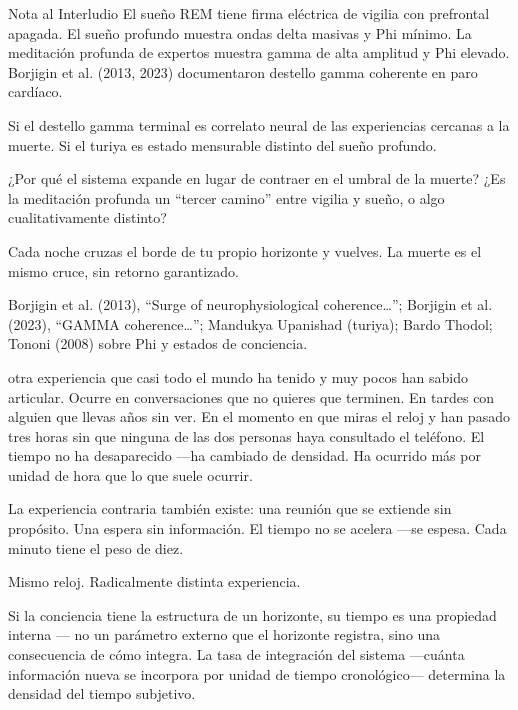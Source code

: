 \begin{notacap}{Nota al Interludio}
 El sueño REM tiene firma eléctrica de vigilia con prefrontal apagada. El sueño profundo muestra ondas delta masivas y Phi mínimo. La meditación profunda de expertos muestra gamma de alta amplitud y Phi elevado. Borjigin et al. (2013, 2023) documentaron destello gamma coherente en paro cardíaco.

 Si el destello gamma terminal es correlato neural de las experiencias cercanas a la muerte. Si el turiya es estado mensurable distinto del sueño profundo.

 ¿Por qué el sistema expande en lugar de contraer en el umbral de la muerte? ¿Es la meditación profunda un “tercer camino” entre vigilia y sueño, o algo cualitativamente distinto?

 Cada noche cruzas el borde de tu propio horizonte y vuelves. La muerte es el mismo cruce, sin retorno garantizado.

 Borjigin et al. (2013), “Surge of neurophysiological coherence…”; Borjigin et al. (2023), “GAMMA coherence…”; Mandukya Upanishad (turiya); Bardo Thodol; Tononi (2008) sobre Phi y estados de conciencia.
\end{notacap}
\noindent {} otra experiencia que casi todo el mundo ha tenido y muy pocos han sabido articular. Ocurre en conversaciones que no quieres que terminen. En tardes con alguien que llevas años sin ver. En el momento en que miras el reloj y han pasado tres horas sin que ninguna de las dos personas haya consultado el teléfono. El tiempo no ha desaparecido —ha cambiado de densidad. Ha ocurrido más por unidad de hora que lo que suele ocurrir.

La experiencia contraria también existe: una reunión que se extiende sin propósito. Una espera sin información. El tiempo no se acelera —se espesa. Cada minuto tiene el peso de diez.

Mismo reloj. Radicalmente distinta experiencia.

\noindent Si la conciencia tiene la estructura de un horizonte, su tiempo es una propiedad interna — no un parámetro externo que el horizonte registra, sino una consecuencia de cómo integra. La tasa de integración del sistema —cuánta información nueva se incorpora por unidad de tiempo cronológico— determina la densidad del tiempo subjetivo.


